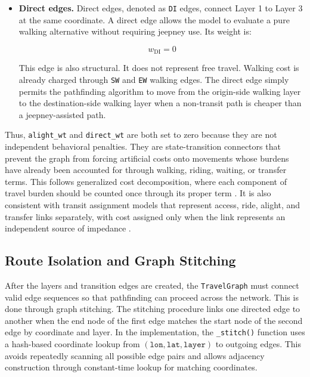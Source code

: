 {{\begin{itemize}
    \item \textbf{Direct edges.} Direct edges, denoted as \texttt{DI} edges, connect Layer 1 to Layer 3 at the same coordinate. A direct edge allows the model to evaluate a pure walking alternative without requiring jeepney use. Its weight is:

    \begin{equation}
    w_{\mathrm{DI}} = 0
    \end{equation}

    This edge is also structural. It does not represent free travel. Walking cost is already charged through \texttt{SW} and \texttt{EW} walking edges. The direct edge simply permits the pathfinding algorithm to move from the origin-side walking layer to the destination-side walking layer when a non-transit path is cheaper than a jeepney-assisted path.
\end{itemize}

Thus, \texttt{alight\_wt} and \texttt{direct\_wt} are both set to zero because they are not independent behavioral penalties. They are state-transition connectors that prevent the graph from forcing artificial costs onto movements whose burdens have already been accounted for through walking, riding, waiting, or transfer terms. This follows generalized cost decomposition, where each component of travel burden should be counted once through its proper term \cite{ortuzar2011modelling}. It is also consistent with transit assignment models that represent access, ride, alight, and transfer links separately, with cost assigned only when the link represents an independent source of impedance \cite{spiess1989optimal}.

\subsection{Route Isolation and Graph Stitching}
After the layers and transition edges are created, the \texttt{TravelGraph} must connect valid edge sequences so that pathfinding can proceed across the network. This is done through graph stitching. The stitching procedure links one directed edge to another when the end node of the first edge matches the start node of the second edge by coordinate and layer. In the implementation, the \texttt{\_stitch()} function uses a hash-based coordinate lookup from \((\texttt{lon}, \texttt{lat}, \texttt{layer})\) to outgoing edges. This avoids repeatedly scanning all possible edge pairs and allows adjacency construction through constant-time lookup for matching coordinates.

}}
